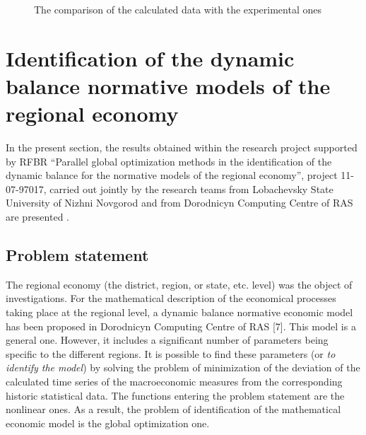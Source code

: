 \begin{figure}
\begin{minipage}{0.5\linewidth}
\end{minipage}
\caption{The comparison of the calculated data with the experimental ones}
\label{8_fig_6}
\end{figure}


\section{Identification of the dynamic balance normative models of the regional economy}

In the present section, the results obtained within the research project supported by RFBR ``Parallel global optimization methods in the identification of the dynamic balance for the normative models of the regional economy'', project 11-07-97017, carried out jointly by the research teams from Lobachevsky State University of Nizhni Novgorod and from Dorodnicyn Computing Centre of RAS are presented \cite{8_Gergel2011}.

\subsection{Problem statement}

The regional economy (the district, region, or state, etc. level) was the object of investigations. For the mathematical description of the economical processes taking place at the regional level, a dynamic balance normative economic model has been proposed in Dorodnicyn Computing Centre of RAS [7]. This model is a general one. However, it includes a significant number of parameters  being specific to the different regions. It is possible to find these parameters (or \textit{to identify the model}) by solving the problem of minimization of the deviation of the calculated time series of the macroeconomic measures from the corresponding historic statistical data. The functions entering the problem statement are the nonlinear ones. As a result, the problem of identification of the mathematical economic model is the global optimization one.


